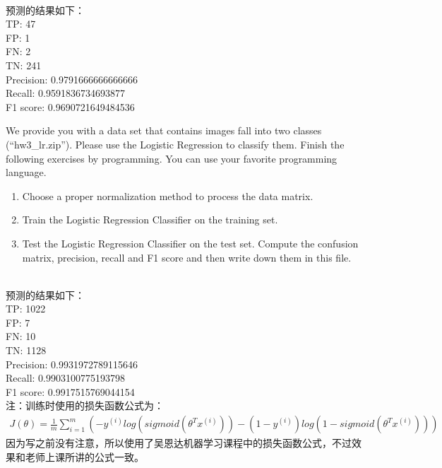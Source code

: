 \documentclass[11pt,letter,notitlepage]{article}
\begin{document}
\begin{solution}
	\heiti
	\ \\
	预测的结果如下：\\
	TP: 47\\
	FP: 1\\
	FN: 2\\
	TN: 241\\
	Precision: 0.9791666666666666\\
	Recall: 0.9591836734693877\\
	F1 score: 0.9690721649484536\\
\end{solution}

\newpage
\begin{exercise}
We provide you with a data set that contains images fall into two classes (``hw3\_lr.zip''). Please use the Logistic Regression to classify them.
Finish the following exercises by programming. You can use your favorite programming language.
\begin{enumerate}
\item Choose a proper normalization method to process the data matrix.
\item Train the Logistic Regression Classifier on the training set.
\item Test the Logistic Regression Classifier on the test set. Compute the confusion matrix, precision, recall and F1 score and then write down them in this file.
\end{enumerate}
\end{exercise}

\begin{solution}
	\heiti
	\ \\
	预测的结果如下：\\
	TP: 1022\\
	FP: 7\\
	FN: 10\\
	TN: 1128\\
	Precision: 0.9931972789115646\\
	Recall: 0.9903100775193798\\
	F1 score: 0.9917515769044154\\
	注：训练时使用的损失函数公式为：
	\begin{align*}
		J(\theta) = \frac{1}{m}\sum\limits_{i=1}^{m}(-y^{(i)}log(sigmoid(\theta^Tx^{(i)})) -(1 - y^{(i)})log(1 - sigmoid(\theta^Tx^{(i)})))
	\end{align*}
	因为写之前没有注意，所以使用了吴恩达机器学习课程中的损失函数公式，不过效果和老师上课所讲的公式一致。

\end{solution}





\end{document}
